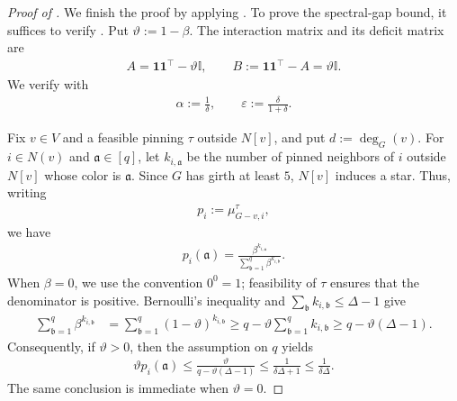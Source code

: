 \documentclass[a4paper,12pt]{article}
\theoremstyle{plain}
\theoremstyle{definition}
\def\*#1{\mathbf{#1}} %
\def\!#1{\mathfrak{#1}} %
\def\*#1{\boldsymbol{#1}} %
\def\!#1{\mathfrak{#1}} %
\renewcommand{\epsilon}{\varepsilon}
\begin{document}
\begin{proof}[Proof of ]
We finish the proof by applying .
To prove the spectral-gap bound, it suffices to verify
.
Put $\vartheta:=1-\beta$.  The interaction matrix and its deficit matrix
are
\begin{align*}
  A=\*1\*1^\intercal-\vartheta\mathbb I,
  \qquad
  B:=\*1\*1^\intercal-A=\vartheta\mathbb I.
\end{align*}
We verify  with
\begin{align*}
  \alpha:=\frac1\delta,
  \qquad
  \epsilon:=\frac{\delta}{1+\delta}.
\end{align*}

Fix $v\in V$ and a feasible pinning $\tau$ outside $N[v]$, and put
$d:=\deg_G(v)$.  For $i\in N(v)$ and $\!a\in[q]$, let
$k_{i,\!a}$ be the number of pinned neighbors of $i$ outside $N[v]$
whose color is $\!a$.  Since $G$ has girth at least $5$, $N[v]$
induces a star.  Thus, writing
\begin{align*}
  p_i:=\mu^\tau_{G-v,i},
\end{align*}
we have
\begin{align*}
  p_i(\!a)
  =
  \frac{\beta^{k_{i,\!a}}}
       {\sum_{\!b=1}^q\beta^{k_{i,\!b}}}.
\end{align*}
When $\beta=0$, we use the convention $0^0=1$; feasibility of $\tau$
ensures that the denominator is positive.  Bernoulli's inequality and
$\sum_{\!b}k_{i,\!b}\leq\Delta-1$ give
\begin{align*}
  \sum_{\!b=1}^q\beta^{k_{i,\!b}}
  &=
  \sum_{\!b=1}^q(1-\vartheta)^{k_{i,\!b}}
  \geq
  q-\vartheta\sum_{\!b=1}^q k_{i,\!b}
  \geq
  q-\vartheta(\Delta-1).
\end{align*}
Consequently, if $\vartheta>0$, then the assumption on $q$ yields
\begin{align}
  \vartheta p_i(\!a)
  \leq
  \frac{\vartheta}{q-\vartheta(\Delta-1)}
  \leq
  \frac1{\delta\Delta+1}
  \leq
  \frac1{\delta\Delta}.
  \label{eq:Potts-leaf-interaction-bound}
\end{align}
The same conclusion is immediate when $\vartheta=0$.


\end{proof}
\end{document}
